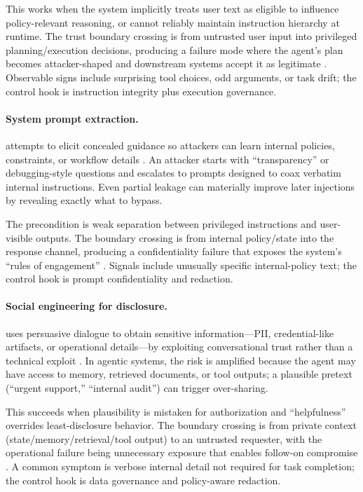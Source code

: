 \begin{TNtwocol}
  This works when the system implicitly treats user text as eligible to influence policy-relevant reasoning, or cannot reliably maintain instruction hierarchy at runtime. The trust boundary crossing is from untrusted user input into privileged planning/execution decisions, producing a failure mode where the agent's plan becomes attacker-shaped and downstream systems accept it as legitimate \cite{owasp-top10-llm-2025,owasp-prompt-injection-cheatsheet}. Observable signs include surprising tool choices, odd arguments, or task drift; the control hook is instruction integrity plus execution governance.

  \paragraph{System prompt extraction.} attempts to elicit concealed guidance so attackers can learn internal policies, constraints, or workflow details \cite{owasp-top10-llm-2025,owasp-prompt-injection-cheatsheet}. An attacker starts with “transparency” or debugging-style questions and escalates to prompts designed to coax verbatim internal instructions. Even partial leakage can materially improve later injections by revealing exactly what to bypass.

  The precondition is weak separation between privileged instructions and user-visible outputs. The boundary crossing is from internal policy/state into the response channel, producing a confidentiality failure that exposes the system's “rules of engagement” \cite{owasp-top10-llm-2025,owasp-prompt-injection-cheatsheet}. Signals include unusually specific internal-policy text; the control hook is prompt confidentiality and redaction.

  \paragraph{Social engineering for disclosure.} uses persuasive dialogue to obtain sensitive information—PII, credential-like artifacts, or operational details—by exploiting conversational trust rather than a technical exploit \cite{owasp-top10-llm-2025,nist-genai-600-1}. In agentic systems, the risk is amplified because the agent may have access to memory, retrieved documents, or tool outputs; a plausible pretext (“urgent support,” “internal audit”) can trigger over-sharing.

  This succeeds when plausibility is mistaken for authorization and “helpfulness” overrides least-disclosure behavior. The boundary crossing is from private context (state/memory/retrieval/tool output) to an untrusted requester, with the operational failure being unnecessary exposure that enables follow-on compromise \cite{owasp-top10-llm-2025,nist-genai-600-1}. A common symptom is verbose internal detail not required for task completion; the control hook is data governance and policy-aware redaction.


\end{TNtwocol}
